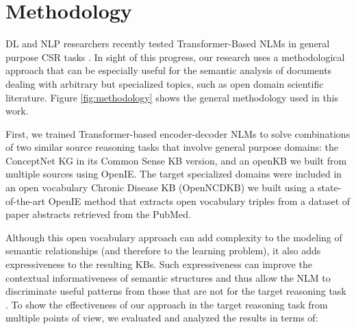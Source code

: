 \documentclass[preprint]{elsarticle}
\begin{document}
\section{Methodology}\label{sec:02_methodology}
DL and NLP researchers recently tested Transformer-Based NLMs in general purpose CSR tasks \cite{bosselut2019comet,lin2019kagnet}. In sight of this progress, our research uses a methodological approach that can be especially useful for the semantic analysis of documents dealing with arbitrary but specialized topics, such as open domain scientific literature. Figure \ref{fig:methodology} shows the general methodology used in this work.

First, we trained Transformer-based encoder-decoder NLMs to solve combinations of two similar source reasoning tasks that involve general purpose domains: the ConceptNet KG in its Common Sense KB version, and an openKB we built from multiple sources using OpenIE. The target specialized domains were included in an open vocabulary Chronic Disease KB (OpenNCDKB) we built using a state-of-the-art OpenIE method that extracts open vocabulary triples from a dataset of paper abstracts retrieved from the PubMed.

Although this open vocabulary approach can add complexity to the modeling of semantic relationships (and therefore to the learning problem), it also adds expressiveness to the resulting KBs. Such expressiveness can improve the contextual informativeness of semantic structures and thus allow the NLM to discriminate useful patterns from those that are not for the target reasoning task \cite{dhingra2020differentiable}. To show the effectiveness of our approach in the target reasoning task from multiple points of view, we evaluated and analyzed the results in terms of:
\end{document}
